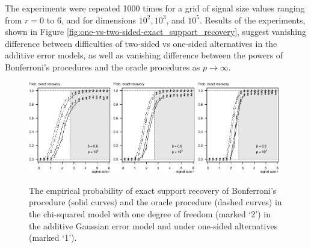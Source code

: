 The experiments were repeated 1000 times for a grid of signal size values ranging from $r=0$ to $6$, and for dimensions $10^2, 10^3$, and $10^5$.
Results of the experiments, shown in Figure \ref{fig:one-vs-two-sided-exact_support_recovery}, suggest vanishing difference between difficulties of two-sided vs one-sided alternatives in the additive error models, as well as vanishing difference between the powers of Bonferroni's procedures and the oracle procedures as $p\to\infty$.

\begin{figure}
      \centering
      \includegraphics[width=0.32\textwidth]{figures/sim_one-vs-two-sided/exact_recovery_one-vs-two-sided_beta06_p100.eps}
      \includegraphics[width=0.32\textwidth]{figures/sim_one-vs-two-sided/exact_recovery_one-vs-two-sided_beta06_p1000.eps}
      \includegraphics[width=0.32\textwidth]{figures/sim_one-vs-two-sided/exact_recovery_one-vs-two-sided_beta06_p100000.eps}
      \caption{The empirical probability of exact support recovery of Bonferroni's procedure (solid curves) and the oracle procedure (dashed curves) in the chi-squared model with one degree of freedom (marked `2') in the additive Gaussian error model and under one-sided alternatives (marked `1'). 
}
\end{figure}
